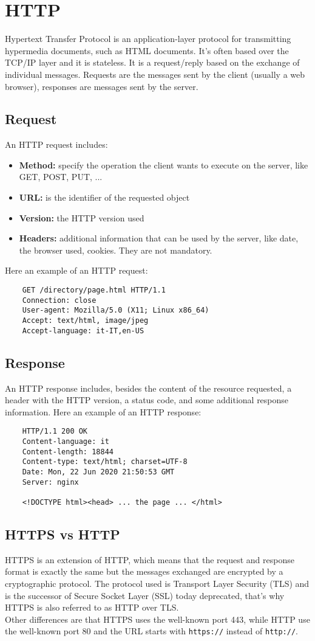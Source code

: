 \section{HTTP}
Hypertext Transfer Protocol is an application-layer protocol for transmitting hypermedia documents, such as HTML documents. It's often based over the TCP/IP layer and it is stateless. It is a request/reply based on the exchange of individual messages. Requests are the messages sent by the client (usually a web browser), responses are messages sent by the server.
\subsection{Request}
An HTTP request includes:
\begin{itemize}
    \item{\textbf{Method:} specify the operation the client wants to execute on the server, like GET, POST, PUT, ...}
    \item{\textbf{URL:} is the identifier of the requested object}
    \item{\textbf{Version:} the HTTP version used}
    \item{\textbf{Headers:} additional information that can be used by the server, like date, the browser used, cookies. They are not mandatory.}
\end{itemize}
Here an example of an HTTP request:
\begin{lstlisting}
    GET /directory/page.html HTTP/1.1
    Connection: close
    User-agent: Mozilla/5.0 (X11; Linux x86_64)
    Accept: text/html, image/jpeg
    Accept-language: it-IT,en-US
\end{lstlisting}

\subsection{Response}
An HTTP response includes, besides the content of the resource requested, a header with the HTTP version, a status code, and some additional response information.
Here an example of an HTTP response:
\begin{lstlisting}
    HTTP/1.1 200 OK
    Content-language: it
    Content-length: 18844
    Content-type: text/html; charset=UTF-8
    Date: Mon, 22 Jun 2020 21:50:53 GMT
    Server: nginx

    <!DOCTYPE html><head> ... the page ... </html>
\end{lstlisting}
\subsection{HTTPS vs HTTP}
HTTPS is an extension of HTTP, which means that the request and response format is exactly the same but the messages exchanged are encrypted by a cryptographic protocol. The protocol used is Transport Layer Security (TLS) and is the successor of Secure Socket Layer (SSL) today deprecated, that's why HTTPS is also referred to as HTTP over TLS.\\
Other differences are that HTTPS uses the well-known port 443, while HTTP use the well-known port 80 and the URL starts with \texttt{https://} instead of \texttt{http://}.
